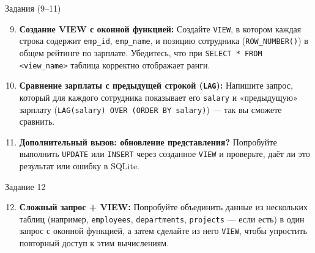 \documentclass{beamer}
\begin{document}
\begin{frame}{Задания (9--11)}
	\begin{enumerate}
		\setcounter{enumi}{8}
		\item \textbf{Создание VIEW с оконной функцией:}
		      Создайте \texttt{VIEW}, в котором каждая строка содержит \texttt{emp\_id}, \texttt{emp\_name},
		      и позицию сотрудника (\texttt{ROW\_NUMBER()}) в общем рейтинге по зарплате.
		      Убедитесь, что при \texttt{SELECT * FROM <view\_name>} таблица корректно отображает ранги.

		\item \textbf{Сравнение зарплаты с предыдущей строкой (\texttt{LAG}):}
		      Напишите запрос, который для каждого сотрудника показывает его \texttt{salary} и «предыдущую» зарплату (\texttt{LAG(salary) OVER (ORDER BY salary)}) — так вы сможете сравнить.

		\item \textbf{Дополнительный вызов: обновление представления?}
		      Попробуйте выполнить \texttt{UPDATE} или \texttt{INSERT} через созданное \texttt{VIEW} и проверьте, даёт ли это результат или ошибку в SQLite.
	\end{enumerate}
\end{frame}

\begin{frame}{Задание 12}
	\begin{enumerate}
		\setcounter{enumi}{11}
		\item \textbf{Сложный запрос + VIEW:}
		      Попробуйте объединить данные из нескольких таблиц (например, \texttt{employees}, \texttt{departments}, \texttt{projects} — если есть)
		      в один запрос с оконной функцией, а затем сделайте из него \texttt{VIEW}, чтобы упростить повторный доступ к этим вычислениям.
	\end{enumerate}
\end{frame}
\end{document}
